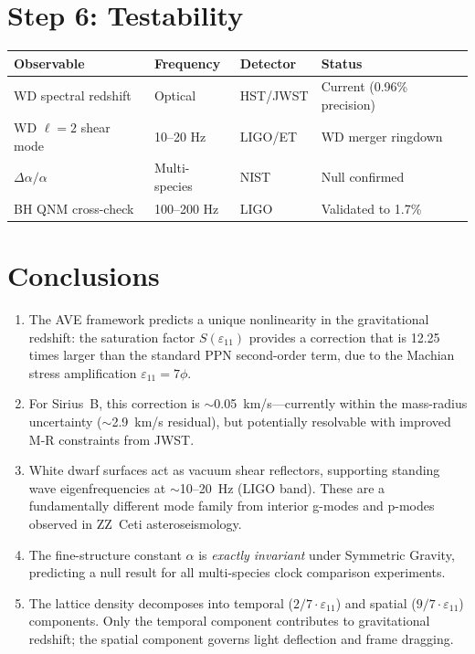 \section{Step 6: Testability}

\begin{center}
\begin{tabular}{llll}
\toprule
\textbf{Observable} & \textbf{Frequency} & \textbf{Detector} & \textbf{Status} \\
\midrule
WD spectral redshift    & Optical        & HST/JWST   & Current (0.96\% precision) \\
WD $\ell=2$ shear mode  & 10--20 Hz      & LIGO/ET    & WD merger ringdown \\
$\Delta\alpha/\alpha$   & Multi-species  & NIST       & Null confirmed \\
BH QNM cross-check      & 100--200 Hz    & LIGO       & Validated to 1.7\% \\
\bottomrule
\end{tabular}
\end{center}

\section{Conclusions}

\begin{enumerate}
    \item The AVE framework predicts a unique nonlinearity in the gravitational
    redshift: the saturation factor $S(\varepsilon_{11})$ provides a correction
    that is 12.25 times larger than the standard PPN second-order term,
    due to the Machian stress amplification $\varepsilon_{11} = 7\phi$.

    \item For Sirius~B, this correction is $\sim$0.05~km/s---currently
    within the mass-radius uncertainty ($\sim$2.9~km/s residual),
    but potentially resolvable with improved M-R constraints from JWST.

    \item White dwarf surfaces act as vacuum shear reflectors,
    supporting standing wave eigenfrequencies at $\sim$10--20~Hz (LIGO band).
    These are a fundamentally different mode family from interior
    g-modes and p-modes observed in ZZ~Ceti asteroseismology.

    \item The fine-structure constant $\alpha$ is \textit{exactly invariant}
    under Symmetric Gravity, predicting a null result for all
    multi-species clock comparison experiments.

    \item The lattice density decomposes into temporal ($2/7 \cdot \varepsilon_{11}$)
    and spatial ($9/7 \cdot \varepsilon_{11}$) components.
    Only the temporal component contributes to gravitational redshift;
    the spatial component governs light deflection and frame dragging.
\end{enumerate}
